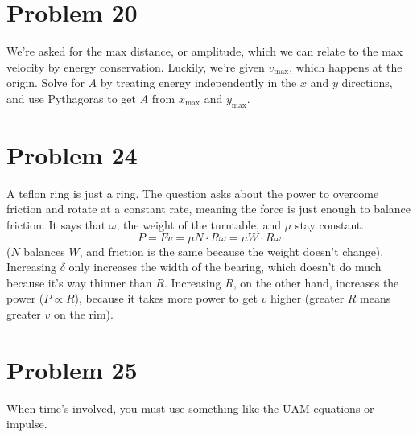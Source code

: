 \documentclass[11pt]{article}
\begin{document}
\section*{Problem 20}
We're asked for the max distance, or amplitude, which we can relate to the max velocity by energy conservation.
Luckily, we're given $v_{\max}$, which happens at the origin.
Solve for $A$ by treating energy independently in the $x$ and $y$ directions, and use Pythagoras to get $A$ from $x_{\max}$ and $y_{\max}$.

\section*{Problem 24}
A teflon ring is just a ring.
The question asks about the power to overcome friction and rotate at a constant rate, meaning the force is just enough to balance friction.
It says that $\omega$, the weight of the turntable, and $\mu$ stay constant.
\[
P=Fv=\mu N\cdot R\omega=\mu W\cdot R\omega
\]
($N$ balances $W$, and friction is the same because the weight doesn't change).
Increasing $\delta$ only increases the width of the bearing, which doesn't do much because it's way thinner than $R$.
Increasing $R$, on the other hand, increases the power ($P\propto R$), because it takes more power to get $v$ higher (greater $R$ means greater $v$ on the rim).

\section*{Problem 25}
When time's involved, you must use something like the UAM equations or impulse.
\end{document}
